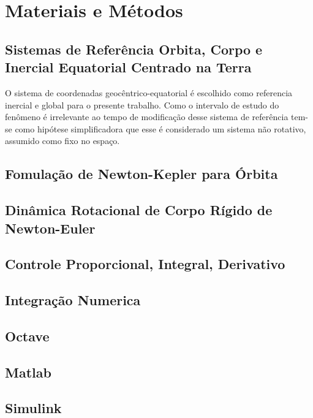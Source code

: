 \chapter{Materiais e Métodos}\label{cap:ferramentas}

\lipsum[12]
\section{Sistemas de Referência Orbita, Corpo e Inercial Equatorial Centrado na Terra}\label{sec:Sistemas de Referência}

O sistema de coordenadas geocêntrico-equatorial é escolhido como referencia inercial e global para o presente trabalho. Como o intervalo de estudo do fenômeno é irrelevante ao tempo de modificação desse sistema de referência tem-se como hipótese simplificadora que esse é considerado um sistema não rotativo, assumido como fixo no espaço.

\section{Fomulação de Newton-Kepler para Órbita}
\lipsum[12]

\section{Dinâmica Rotacional de Corpo Rígido de Newton-Euler}
\lipsum[12]

\section{Controle Proporcional, Integral, Derivativo}
\lipsum[12]

\section{Integração Numerica}
\lipsum[12]

\section{Octave}
\lipsum[12]

\section{Matlab}
\lipsum[12]

\section{Simulink}
\lipsum[12]
